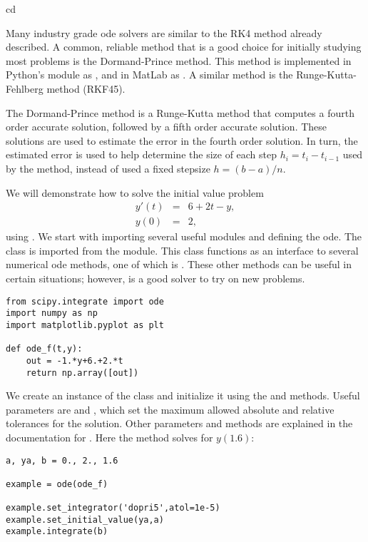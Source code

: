 cd 
\label{lab:DormandPrince}

Many industry grade ode solvers are similar to the RK4 method already described. A common, reliable method that is a good choice for initially studying most problems is the Dormand-Prince method. This method is implemented in Python's  module as , and in MatLab as . A similar method is the Runge-Kutta-Fehlberg method (RKF45). 

The Dormand-Prince method is a Runge-Kutta method that computes a fourth order accurate solution, followed by a fifth order accurate solution. These solutions are used to estimate the error in the fourth order solution. In turn, the estimated error is used to help determine the size of each step $h_i = t_i-t_{i-1}$ used by the method, instead of used a fixed stepsize $h = (b-a)/n$. 

We will demonstrate how to solve the initial value problem
\begin{eqnarray*}
y'(t) &=& 6+2t-y, \\
y(0) &=& 2,
\end{eqnarray*}
using . We start with importing several useful modules and defining the ode.  The  class is imported from the  module. This class functions as an interface to several numerical ode methods, one of which is . These other methods can be useful in certain situations; however,  is a good solver to try on new problems. 

\begin{lstlisting}
from scipy.integrate import ode
import numpy as np
import matplotlib.pyplot as plt

def ode_f(t,y):
	out = -1.*y+6.+2.*t
	return np.array([out])
\end{lstlisting}

We create an instance of the  class and initialize it using the  and  methods. Useful parameters are  and , which set the maximum allowed absolute and relative tolerances for the solution. Other parameters and methods are explained in the documentation for .  Here the method solves for $y(1.6)$:

\begin{lstlisting}
a, ya, b = 0., 2., 1.6

example = ode(ode_f)

example.set_integrator('dopri5',atol=1e-5) 
example.set_initial_value(ya,a) 
example.integrate(b)
\end{lstlisting}

